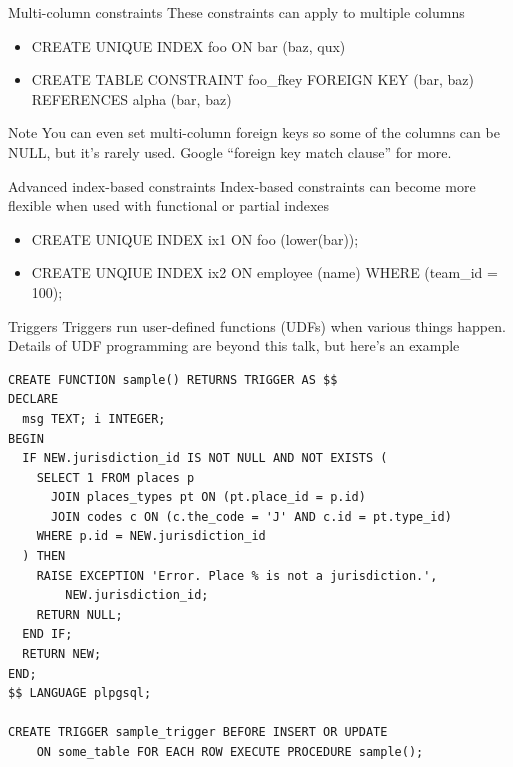 \documentclass{beamer}
\begin{document}
\begin{frame}{Multi-column constraints}
    These constraints can apply to multiple columns
    \begin{itemize}
        \item CREATE UNIQUE INDEX foo ON bar (baz, qux)
        \item CREATE TABLE CONSTRAINT foo\_fkey FOREIGN KEY (bar, baz) REFERENCES alpha (bar, baz)
    \end{itemize}
    \vspace{0.1\textheight}
    \begin{block}{Note}
        You can even set multi-column foreign keys so some of the columns can be NULL, but it's rarely used. Google ``foreign key match clause'' for more.
    \end{block}
\end{frame}

\begin{frame}{Advanced index-based constraints}
    Index-based constraints can become more flexible when used with functional or partial indexes
    \begin{itemize}
        \item CREATE UNIQUE INDEX ix1 ON foo (lower(bar));
        \item CREATE UNQIUE INDEX ix2 ON employee (name) WHERE (team\_id = 100);
    \end{itemize}
\end{frame}

\begin{frame}{Triggers}
    Triggers run user-defined functions (UDFs) when various things happen. Details of UDF programming are beyond this talk, but here's an example
\end{frame}

\begin{frame}[fragile]
    \footnotesize
    \begin{Verbatim}[fontfamily=courier]
CREATE FUNCTION sample() RETURNS TRIGGER AS $$
DECLARE
  msg TEXT; i INTEGER;
BEGIN
  IF NEW.jurisdiction_id IS NOT NULL AND NOT EXISTS (
    SELECT 1 FROM places p
      JOIN places_types pt ON (pt.place_id = p.id)
      JOIN codes c ON (c.the_code = 'J' AND c.id = pt.type_id)
    WHERE p.id = NEW.jurisdiction_id
  ) THEN
    RAISE EXCEPTION 'Error. Place % is not a jurisdiction.',
        NEW.jurisdiction_id;
    RETURN NULL;
  END IF;
  RETURN NEW;
END;
$$ LANGUAGE plpgsql;

CREATE TRIGGER sample_trigger BEFORE INSERT OR UPDATE
    ON some_table FOR EACH ROW EXECUTE PROCEDURE sample();
    \end{Verbatim}
\end{frame}
\end{document}
